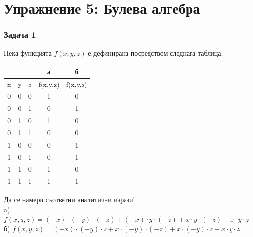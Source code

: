 \documentclass[fleqn, 12pt]{article}
\theoremstyle{definition}
\begin{document}
\newpage
\section{Упражнение 5: Булева алгебра}

\subsubsection*{Задача 1}
Нека функцията $f(x,y,z)$ е дефинирана посредством следната таблица:
\begin{table}[htp]
\begin{center}
\begin{tabular}{|c|c|c|c|c|} 
\hline
  &  &   & а  & б \\
\hline
x & y & z & f(x,y,z) & f(x,y,z) \\
\hline
0 & 0 & 0 & 1 & 0 \\
\hline
0 & 0 & 1 & 0 & 1 \\
\hline
0 & 1 & 0 & 1 & 0 \\
\hline
0 & 1 & 1 & 0 & 0 \\
\hline
1 & 0 & 0 & 0 & 1 \\
\hline
1 & 0 & 1 & 0 & 1 \\
\hline
1 & 1 & 0 & 1 & 0 \\
\hline
1 & 1 & 1 & 1 & 1 \\
\hline
\end{tabular}
\end{center}
\end{table}
Да се намери съответни аналитични изрази!  \\
a) $f(x,y,z) = (-x) \cdot (-y) \cdot (-z) +(-x) \cdot y \cdot (-z) + x \cdot y \cdot (-z) + x \cdot y \cdot z$  \\
б) $f(x,y,z) = (-x) \cdot (-y) \cdot z + x \cdot (-y) \cdot(-z) + x \cdot (-y) \cdot z + x \cdot y \cdot z$
\end{document}
